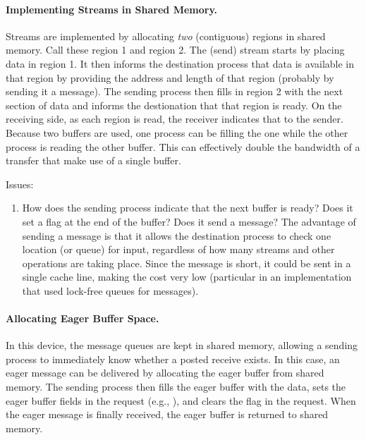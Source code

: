 \paragraph{Implementing Streams in Shared Memory.}
Streams are implemented by allocating \emph{two} (contiguous) regions in
shared memory.  Call these region 1 and region 2.  The (send) stream starts by
placing data in region 1.  It then informs the destination process that data
is available in that region by providing the address and length of that
region (probably by sending it a message).  The sending process then fills in
region 2 with the next section of data and informs the destionation that that
region is ready.  On the receiving side, as each region is read, the receiver
indicates that to the sender.  Because two buffers are used, one process can
be filling the one while the other process is reading the other buffer.  This
can effectively double the bandwidth of a transfer that make use of a single
buffer.


Issues:
\begin{enumerate}
\item How does the sending process indicate that the next buffer is ready?
  Does it set a flag at the end of the buffer?  Does it send a message?  The
  advantage of sending a message is that it allows the destination process to
  check one location (or queue) for input, regardless of how many streams and
  other operations are taking place.  Since the message is short, it could be
  sent in a single cache line, making the cost very low (particular in an
  implementation that used lock-free queues for messages).  

\end{enumerate}

\paragraph{Allocating Eager Buffer Space.}
In this device, the message queues are kept in shared memory, allowing a
sending process to immediately know whether a posted receive exists.  In this
case, an eager message can be delivered by allocating the eager buffer from
shared memory.  The sending process then fills the eager buffer with the data,
sets the eager buffer fields in the request (e.g., ),
and clears the  flag in the request.  When the eager message is
finally received, the eager buffer is returned to shared memory.

